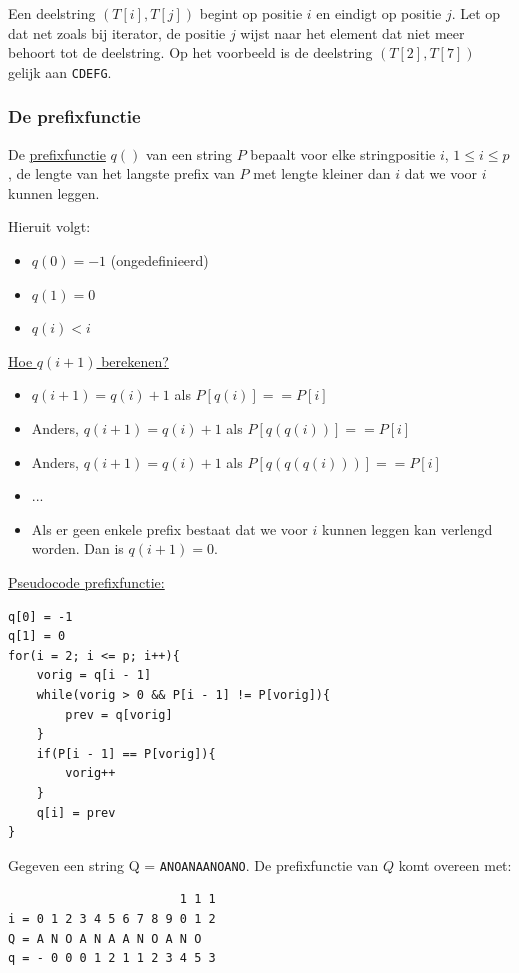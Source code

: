 \documentclass{report}
\begin{document}
Een deelstring $(T[i], T[j])$ begint op positie $i$ en eindigt op positie $j$. Let op dat net zoals bij iterator, de positie $j$ wijst naar het element dat niet meer behoort tot de deelstring. Op het voorbeeld is de deelstring $(T[2], T[7])$ gelijk aan \texttt{CDEFG}.

\subsubsection{De prefixfunctie}
De \underline{prefixfunctie} $q()$ van een string $P$ bepaalt voor elke stringpositie $i$, $1 \leq i \leq p$, de lengte van het langste prefix van $P$ met lengte kleiner dan $i$ dat we voor $i$ kunnen leggen.  

Hieruit volgt:
\begin{itemize}
	\item $q(0) = -1$ (ongedefinieerd)
	\item $q(1) = 0$
	\item $q(i) < i$
\end{itemize}

\underline{Hoe $q(i + 1)$ berekenen?}
\begin{itemize}
	\item $q(i + 1) = q(i) + 1$ als $P[q(i)] == P[i]$
	\item Anders, $q(i + 1) = q(i) + 1$ als $P[q(q(i))] == P[i]$
	\item Anders, $q(i + 1) = q(i) + 1$ als $P[q(q(q(i)))] == P[i]$
	\item ...
	\item Als er geen enkele prefix bestaat dat we voor $i$ kunnen leggen kan verlengd worden. Dan is $q(i + 1) = 0$.
\end{itemize}

\underline{Pseudocode prefixfunctie:}
\begin{lstlisting}
q[0] = -1
q[1] = 0
for(i = 2; i <= p; i++){
	vorig = q[i - 1]
	while(vorig > 0 && P[i - 1] != P[vorig]){
		prev = q[vorig]
	}
	if(P[i - 1] == P[vorig]){
		vorig++
	}
	q[i] = prev
}
\end{lstlisting}

Gegeven een string Q = \texttt{ANOANAANOANO}. De prefixfunctie van $Q$ komt overeen met:
\begin{lstlisting}
                        1 1 1 
i = 0 1 2 3 4 5 6 7 8 9 0 1 2 
Q = A N O A N A A N O A N O
q = - 0 0 0 1 2 1 1 2 3 4 5 3
\end{lstlisting}
\end{document}
